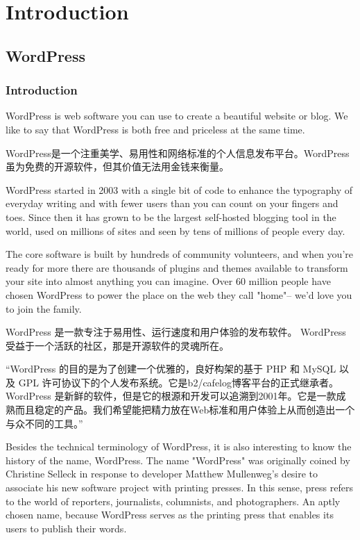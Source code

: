 \part{Introduction}


\chapter{WordPress}

\section{Introduction}

WordPress is web software you can use to create a beautiful website or blog. We like to say that WordPress is both free and priceless at the same time.

WordPress是一个注重美学、易用性和网络标准的个人信息发布平台。WordPress虽为免费的开源软件，但其价值无法用金钱来衡量。





WordPress started in 2003 with a single bit of code to enhance the typography of everyday writing and with fewer users than you can count on your fingers and toes. Since then it has grown to be the largest self-hosted blogging tool in the world, used on millions of sites and seen by tens of millions of people every day.

The core software is built by hundreds of community volunteers, and when you're ready for more there are thousands of plugins and themes available to transform your site into almost anything you can imagine. Over 60 million people have chosen WordPress to power the place on the web they call "home"-- we'd love you to join the family.

WordPress 是一款专注于易用性、运行速度和用户体验的发布软件。 WordPress 受益于一个活跃的社区，那是开源软件的灵魂所在。



\begin{shaded}
“WordPress 的目的是为了创建一个优雅的，良好构架的基于 PHP 和 MySQL 以及 GPL 许可协议下的个人发布系统。它是b2/cafelog博客平台的正式继承者。WordPress 是新鲜的软件，但是它的根源和开发可以追溯到2001年。它是一款成熟而且稳定的产品。我们希望能把精力放在Web标准和用户体验上从而创造出一个与众不同的工具。”
\end{shaded}

Besides the technical terminology of WordPress, it is also interesting to know the history of the name, WordPress. The name "WordPress" was originally coined by Christine Selleck in response to developer Matthew Mullenweg's desire to associate his new software project with printing presses. In this sense, press refers to the world of reporters, journalists, columnists, and photographers. An aptly chosen name, because WordPress serves as the printing press that enables its users to publish their words.

